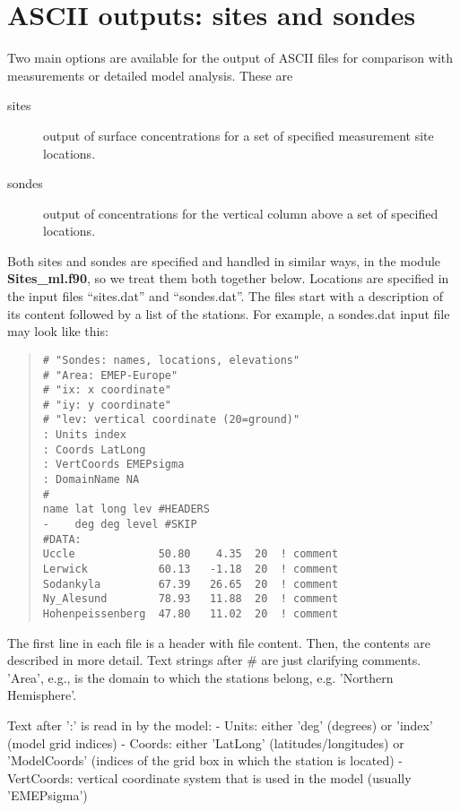 \newpage
\section{ASCII outputs: sites and sondes}\label{sec:sitesonde}


Two main options are available for the output of ASCII files for comparison
with measurements or detailed model analysis. These are

\begin{description}
\item[sites]  

      output of surface concentrations for a set of specified
      measurement site locations.
\item[sondes] 

      output of concentrations for the vertical column above
     a set of specified locations.
\end{description}

Both sites and sondes are specified and handled in similar ways, in
the module {\bf Sites\_ml.f90}, so we treat them both together below.
Locations are specified in the input files ``sites.dat'' and ``sondes.dat''. 
The files start with a description of its content
followed by a list of the stations. For example, a sondes.dat input file
may look like this:

\begin{small}
\begin{quote}
\begin{verbatim}
# "Sondes: names, locations, elevations"
# "Area: EMEP-Europe"
# "ix: x coordinate"
# "iy: y coordinate"
# "lev: vertical coordinate (20=ground)"
: Units index
: Coords LatLong
: VertCoords EMEPsigma
: DomainName NA
#
name lat long lev #HEADERS
-    deg deg level #SKIP
#DATA:
Uccle             50.80    4.35  20  ! comment
Lerwick           60.13   -1.18  20  ! comment
Sodankyla         67.39   26.65  20  ! comment
Ny_Alesund        78.93   11.88  20  ! comment
Hohenpeissenberg  47.80   11.02  20  ! comment
\end{verbatim}

\end{quote}
\end{small}


The first line in each file is a header with file content.
Then, the contents are described in more detail. Text strings after
\# are just clarifying comments. 'Area', e.g., is the domain to which
the stations belong, e.g. 'Northern Hemisphere'.

Text after ':' is read in by the model:\newline
- Units: either 'deg' (degrees) or 'index' (model grid indices)\newline
- Coords: either 'LatLong' (latitudes/longitudes) or 'ModelCoords'
(indices of the grid box in which the station is located)\newline
- VertCoords: vertical coordinate system that is used in the model (usually
'EMEPsigma')\newline


